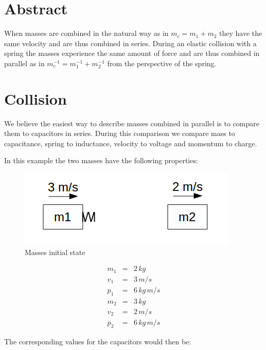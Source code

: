 
\section{Abstract}

When masses are combined in the natural way as in $m_c = m_1 + m_2$ they have the same velocity and are thus combined in series.
During an elastic collision with a spring the masses experience the same amount of force and are thus combined in parallel as in $m^{-1}_c = m^{-1}_1 + m^{-1}_2$ from the perspective of the spring.

\section{Collision}

We believe the easiest way to describe masses combined in parallel is to compare them to capacitors in series.
During this comparison\cite{wpana} we compare mass to capacitance, spring to inductance, velocity to voltage and momentum to charge.

In this example the two masses have the following properties:

\begin{figure}[ht] \centering
	\includegraphics[scale=.5]{mms1} \caption{Masses initial state}
\end{figure}

\begin{eqnarray}
m_1 &=& 2 \, kg \\
v_1 &=& 3 \, m/s \\
p_1 &=& 6 \, kg \, m/s \\
m_2 &=& 3 \, kg \\
v_2 &=& 2 \, m/s \\
p_2 &=& 6 \, kg \, m/s
\end{eqnarray}

The corresponding values for the capacitors would then be:

